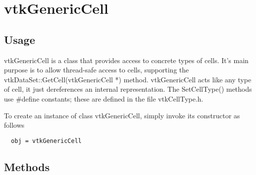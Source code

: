 \section{vtkGenericCell}

\subsection{Usage}

 vtkGenericCell is a class that provides access to concrete types of cells.
 It's main purpose is to allow thread-safe access to cells, supporting
 the vtkDataSet::GetCell(vtkGenericCell *) method. vtkGenericCell acts
 like any type of cell, it just dereferences an internal representation.
 The SetCellType() methods use \#define constants; these are defined in
 the file vtkCellType.h.

To create an instance of class vtkGenericCell, simply
invoke its constructor as follows
\begin{verbatim}
  obj = vtkGenericCell
\end{verbatim}
\subsection{Methods}

